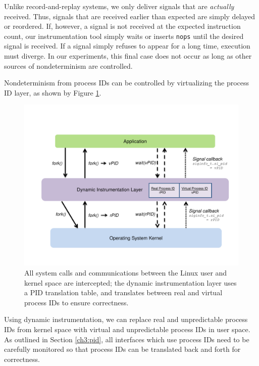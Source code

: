 Unlike record-and-replay systems, we only
deliver signals that are {\em actually}
received. Thus, signals that are received earlier
than expected are simply delayed or reordered. If,
however, a signal is not received at the expected
instruction count, our instrumentation tool
simply waits or inserts \texttt{nops} until the 
desired signal is received. If a signal simply
refuses to appear for a long time, execution
must diverge. In our experiments,
this final case does not occur as long
as other sources of nondeterminism are controlled. \newline

 \newline
Nondeterminism from process IDs
can be controlled by virtualizing the process ID
layer, as shown by Figure \ref{ch3:pidfig}.

\begin{figure}[h]
  \center
  \includegraphics[trim=0cm 1cm 0cm 0.5cm, scale=0.60]{pid.pdf}
  \caption[Virtualizing the process ID layer using Pin]%
  {All system calls and communications
  between the Linux user and kernel space are intercepted; 
  the dynamic instrumentation layer
  uses a PID translation table, and
  translates between real and virtual process IDs
  to ensure correctness. }
  
  \label{ch3:pidfig}
\end{figure} 

Using dynamic instrumentation, we can replace
real and unpredictable process IDs from kernel space
with virtual and unpredictable process IDs in user space.
As outlined in Section \ref{ch3:pid}, all interfaces
which use process IDs need to be carefully monitored
so that process IDs can be translated back and forth
for correctness. \newline

